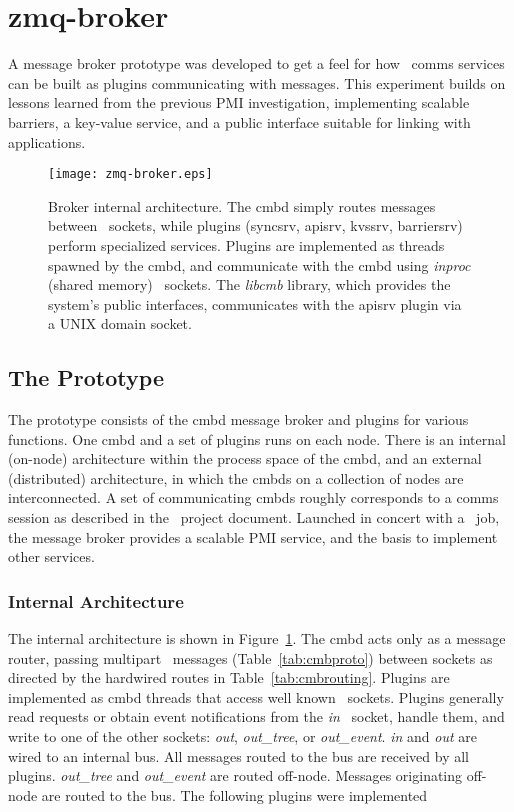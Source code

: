 \section{zmq-broker}

A message broker prototype was developed to get a feel for how \ngrm\ 
comms services can be built as plugins communicating with messages.
This experiment builds on lessons learned from the previous PMI
investigation, implementing scalable barriers, a key-value service,
and a public interface suitable for linking with applications.

\begin{figure}
\centering
\texttt{[image: zmq-broker.eps]}
\caption{Broker internal architecture.  The cmbd simply routes messages
between \zMQ\ sockets, while plugins (syncsrv, apisrv, kvssrv, barriersrv)
perform specialized services.
Plugins are implemented as threads spawned by the cmbd, and communicate
with the cmbd using {\em inproc} (shared memory) \zMQ\ sockets.
The {\em libcmb} library, which provides the system's public interfaces,
communicates with the apisrv plugin via a UNIX domain socket.}
\label{fig:cmbint}
\end{figure}

\subsection{The Prototype}

The prototype consists of the cmbd message broker and plugins for various
functions.  One cmbd and a set of plugins runs on each node.
There is an internal (on-node) architecture within the process space of
the cmbd, and an external (distributed) architecture, in which the cmbds
on a collection of nodes are interconnected.  A set of communicating cmbds
roughly corresponds to a comms session as described in the \ngrm\ project
document.  Launched in concert with a \slurm\ job, the message broker
provides a scalable PMI service, and the basis to implement other services.

\subsubsection {Internal Architecture}
The internal architecture is shown in Figure~\ref{fig:cmbint}.
The cmbd acts only as a message router, passing multipart \zMQ\ messages
(Table~\ref{tab:cmbproto}) between sockets as directed by the hardwired
routes in Table~\ref{tab:cmbrouting}.
Plugins are implemented as cmbd threads that access well known \zMQ\ sockets.
Plugins generally read requests or obtain event notifications from the
{\em in} \zMQ\ socket, handle them, and write to one of the other sockets:
{\em out}, {\em out\_tree}, or {\em out\_event}.  {\em in} and {\em out}
are wired to an internal bus.  All messages routed to the bus are received
by all plugins.  {\em out\_tree} and {\em out\_event} are routed off-node.
Messages originating off-node are routed to the bus.  The following
plugins were implemented

